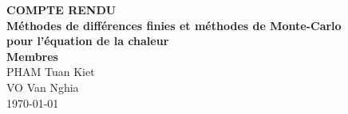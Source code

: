 \onehalfspacing


\begin{titlepage}
\vspace*{\fill}
\begin{center}
\LARGE{\textbf{COMPTE RENDU}}\\

\Large{\textbf{Méthodes de différences finies et méthodes de Monte-Carlo}}\\
\Large{\textbf{pour l’équation de la chaleur}}\\
\vspace*{1\baselineskip}
\Large{\textbf{Membres}}\\
PHAM Tuan Kiet\\
VO Van Nghia\\
\vfill %
\vspace*{\fill}
\today
\end{center}
\end{titlepage}

\newpage

\newpage

\newpage
{}
